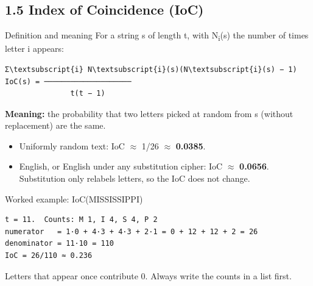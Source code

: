 \documentclass[11pt,a4paper]{article}
\begin{document}
\subsection*{1.5 Index of Coincidence (IoC)}\label{ch1-ioc}
\begin{concept}{Definition and meaning}
For a string s of length t, with N\textsubscript{i}(s) the number of times letter i appears:\par
\begin{workbox}
\begin{Verbatim}[commandchars=\\\{\},fontsize=\footnotesize]
          Σ\textsubscript{i} N\textsubscript{i}(s)(N\textsubscript{i}(s) − 1)
IoC(s) = ────────────────────
               t(t − 1)
\end{Verbatim}
\end{workbox}
\textbf{Meaning:} the probability that two letters picked at random from s (without replacement) are the same.\par
\begin{itemize}
\item Uniformly random text: IoC \ensuremath{\approx} 1/26 \ensuremath{\approx} \textbf{0.0385}.
\item English, or English under any substitution cipher: IoC \ensuremath{\approx} \textbf{0.0656}. Substitution only relabels letters, so the IoC does not change.
\end{itemize}
\end{concept}
\begin{example}{Worked example: IoC(MISSISSIPPI)}
\begin{workbox}
\begin{Verbatim}[commandchars=\\\{\},fontsize=\footnotesize]
t = 11.  Counts: M 1, I 4, S 4, P 2
numerator   = 1·0 + 4·3 + 4·3 + 2·1 = 0 + 12 + 12 + 2 = 26
denominator = 11·10 = 110
IoC = 26/110 ≈ 0.236
\end{Verbatim}
\end{workbox}
Letters that appear once contribute 0. Always write the counts in a list first.\par
\end{example}
\end{document}
